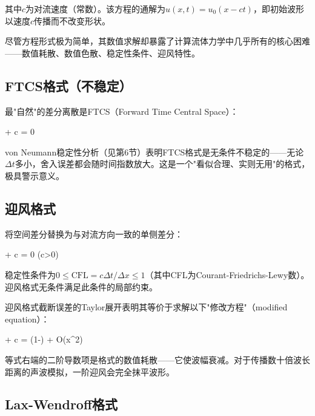 其中$c$为对流速度（常数）。该方程的通解为$u(x,t) = u_0(x - ct)$，即初始波形以速度$c$传播而不改变形状。

尽管方程形式极为简单，其数值求解却暴露了计算流体力学中几乎所有的核心困难——数值耗散、数值色散、稳定性条件、迎风特性。

\subsection{FTCS格式（不稳定）}

最"自然"的差分离散是FTCS（Forward Time Central Space）：

\begin{myformula}
 + c = 0
\end{myformula}

von Neumann稳定性分析（见第6节）表明FTCS格式是无条件不稳定的——无论$\Delta t$多小，舍入误差都会随时间指数放大。这是一个"看似合理、实则无用"的格式，极具警示意义。

\subsection{迎风格式}

将空间差分替换为与对流方向一致的单侧差分：

\begin{myformula}
 + c = 0 \quad (c>0)
\end{myformula}

稳定性条件为$0 \leq \text{CFL} = c\Delta t/\Delta x \leq 1$（其中CFL为Courant-Friedrichs-Lewy数）。迎风格式无条件满足此条件的局部约束。

迎风格式截断误差的Taylor展开表明其等价于求解以下"修改方程"（modified equation）：

\begin{myformula}
 + c = \left(1-\right) + O(\Delta x^{2})
\end{myformula}

等式右端的二阶导数项是格式的数值耗散——它使波幅衰减。对于传播数十倍波长距离的声波模拟，一阶迎风会完全抹平波形。

\subsection{Lax-Wendroff格式}

